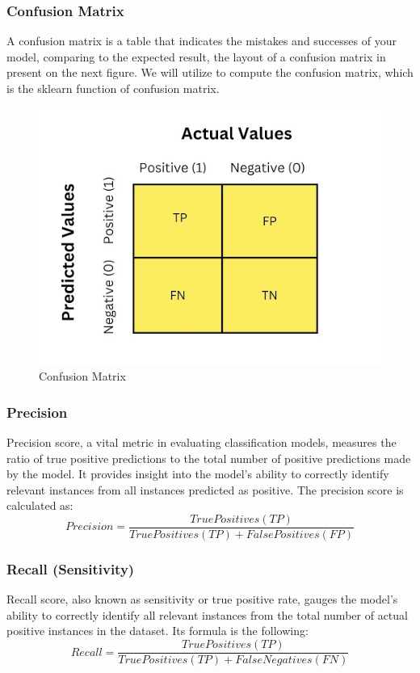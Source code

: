 \subsubsection{Confusion Matrix}
A confusion matrix is a table that
indicates the mistakes and successes of your model, comparing to the expected result, the layout of a confusion matrix in present on the next figure. We will utilize to compute the confusion matrix, which is the sklearn function of confusion matrix.

\begin{figure}[h!]
    \centering
    \includegraphics[width=0.75\linewidth]{images/confusion_matrix.png}
    \caption{Confusion Matrix}
    \label{fig:enter-label}
\end{figure}


\subsubsection{Precision}
Precision score, a vital metric in evaluating classification models, measures the ratio of true positive predictions to the total number of positive predictions made by the model. It provides insight into the model’s ability to correctly identify relevant instances from all instances predicted as positive.
The precision score is calculated as:
\[Precision=\frac{True Positives (TP)}{True Positives (TP)+False Positives (FP)}\]

\subsubsection{Recall (Sensitivity)}
Recall score, also known as sensitivity or true positive rate, gauges the model’s ability to correctly identify all relevant instances from the total number of actual positive instances in the dataset.
Its formula is the following:
\[Recall=\frac{True Positives (TP)}{True Positives (TP)+False Negatives (FN)}\]

